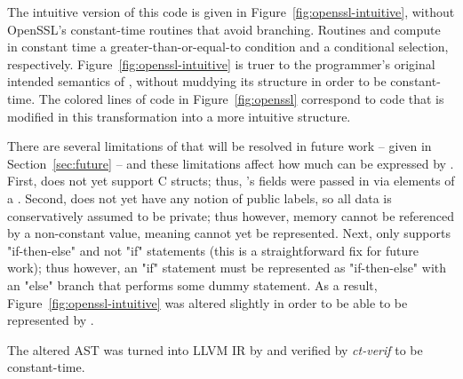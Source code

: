 The intuitive version of this code is given in Figure~\ref{fig:openssl-intuitive}, without OpenSSL's constant-time routines that avoid branching. Routines  and  compute in constant time a greater-than-or-equal-to condition and a conditional selection, respectively. Figure~\ref{fig:openssl-intuitive} is truer to the programmer's original intended semantics of , without muddying its structure in order to be constant-time. The colored lines of code in Figure~\ref{fig:openssl} correspond to code that is modified in this transformation into a more intuitive structure.

There are several limitations of \constc that will be resolved in future work -- given in Section~\ref{sec:future} -- and these limitations affect how much  can be expressed by \ccore. First, \ccore does not yet support C structs; thus, 's fields were passed in via elements of a \bytearray. Second, \ccore does not yet have any notion of public labels, so all data is conservatively assumed to be private; thus however, memory cannot be referenced by a non-constant value, meaning  cannot yet be represented. Next, \ccore only supports "if-then-else" and not "if" statements (this is a straightforward fix for future work); thus however, an "if" statement must be represented as "if-then-else" with an "else" branch that performs some dummy statement. As a result, Figure~\ref{fig:openssl-intuitive} was altered slightly in order to be able to be represented by \ccore.

The altered  AST was turned into LLVM IR by \constc and verified by \emph{ct-verif} to be constant-time.
